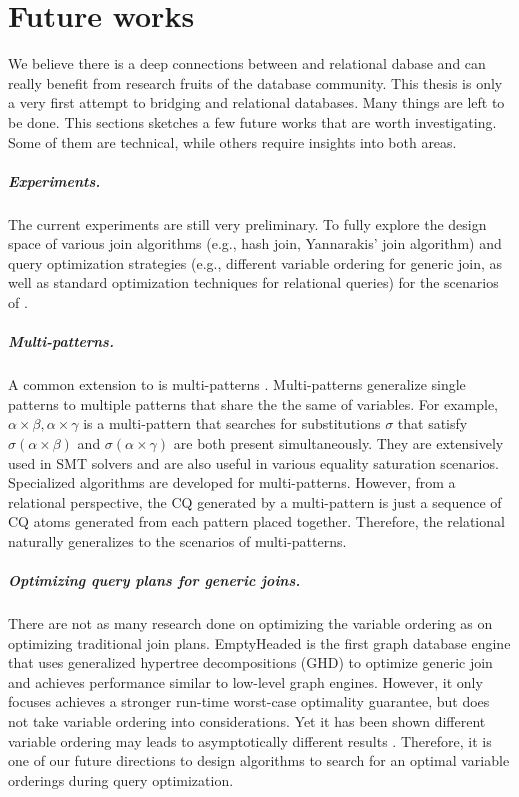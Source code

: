 \chapter{Future works}
\label{sec:future}
We believe there is a deep connections between \egraphs and relational dabase and \egraph can really benefit from research fruits of the database community. This thesis is only a very first attempt to bridging \egraphs and relational databases. Many things are left to be done. This sections sketches a few future works that are worth investigating. Some of them are technical, while others require insights into both areas.

\paragraph{Experiments.}
The current experiments are still very preliminary. To fully explore the design space of various join algorithms (e.g., hash join, Yannarakis' join algorithm) and query optimization strategies (e.g., different variable ordering for generic join, as well as standard optimization techniques for relational queries) for the scenarios of \ematching.

\paragraph{Multi-patterns.} A common extension to \ematching is multi-patterns \citep{efficient-ematching}. Multi-patterns generalize single patterns to multiple patterns that share the the same of variables. For example, $\alpha \times \beta, \alpha\times \gamma$ is a multi-pattern that searches for substitutions $\sigma$ that satisfy $\sigma(\alpha\times\beta)$ and $\sigma(\alpha\times\gamma)$ are both present simultaneously. They are extensively used in SMT solvers and are also useful in various equality saturation scenarios. Specialized algorithms are developed for multi-patterns. However, from a relational perspective, the CQ generated by a multi-pattern is just a sequence of CQ atoms generated from each pattern placed together. Therefore, the relational \ematching naturally generalizes to the scenarios of multi-patterns.

\paragraph{Optimizing query plans for generic joins.} There are not as many research done on optimizing the variable ordering as on optimizing traditional join plans. EmptyHeaded is the first graph database engine that uses generalized hypertree decompositions (GHD) to optimize generic join and achieves performance similar to low-level graph engines. However, it only focuses achieves a stronger run-time worst-case optimality guarantee, but does not take variable ordering into considerations. Yet it has been shown different variable ordering may leads to asymptotically different results \citep{eval-wcoj}. Therefore, it is one of our future directions to design algorithms to search for an optimal variable orderings during query optimization.

